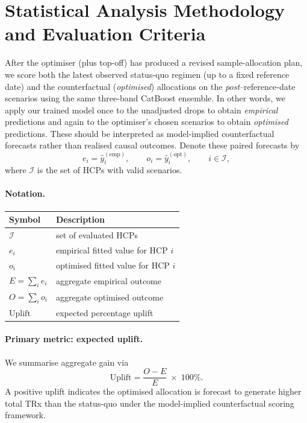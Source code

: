 \section{Statistical Analysis Methodology and Evaluation Criteria}
\label{sec:stats_eval}

After the optimiser (plus top-off) has produced a revised sample-allocation plan, we score both the latest observed status-quo regimen (up to a fixed reference date) and the counterfactual (\emph{optimised}) allocations on the \emph{post}--reference-date scenarios using the same three-band CatBoost ensemble. In other words, we apply our trained model once to the unadjusted drops to obtain \emph{empirical} predictions and again to the optimiser's chosen scenarios to obtain \emph{optimised} predictions. These should be interpreted as model-implied counterfactual forecasts rather than realised causal outcomes. Denote these paired forecasts by
\[
  e_i = \widehat y_i^{(\mathrm{emp})},
  \qquad
  o_i = \widehat y_i^{(\mathrm{opt})},
  \qquad
  i \in \mathcal I,
\]
where \(\mathcal I\) is the set of HCPs with valid scenarios.

\paragraph{Notation.}
\begin{center}
\begin{tabular}{@{}ll@{}}
\toprule
Symbol & Description \\ \midrule
\(\mathcal I\)      & set of evaluated HCPs \\
\(e_i\)             & empirical fitted value for HCP \(i\) \\
\(o_i\)             & optimised fitted value for HCP \(i\) \\
\(E = \sum_i e_i\)  & aggregate empirical outcome \\
\(O = \sum_i o_i\)  & aggregate optimised outcome \\
\(\mathrm{Uplift}\) & expected percentage uplift \\
\bottomrule
\end{tabular}
\end{center}

\paragraph{Primary metric: expected uplift.}
We summarise aggregate gain via
\[
  \mathrm{Uplift}
  = \frac{O - E}{E}\;\times\;100\%.
\]
A positive uplift indicates the optimised allocation is forecast to generate higher total TRx than the status-quo under the model-implied counterfactual scoring framework.

